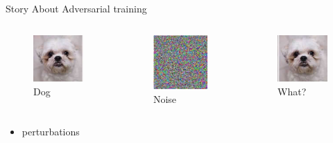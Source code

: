 \begin{frame}[fragile]{Story About Adversarial training}
	\begin{columns}[onlytextwidth]
		\begin{figure}
			\caption{Dog}
			\includegraphics[height=0.5\textheight]{fig0.jpg}
		\end{figure}
		\begin{figure}
			\caption{Noise}
			\includegraphics[height=0.5\textheight]{zy.jpg}
		\end{figure}
		\begin{figure}
			\caption{What?}
			\includegraphics[height=0.5\textheight]{fig2.jpg}
		\end{figure}
		
	\end{columns}
	\begin{itemize}
		\item perturbations
	\end{itemize}
	
	
	
\end{frame}

